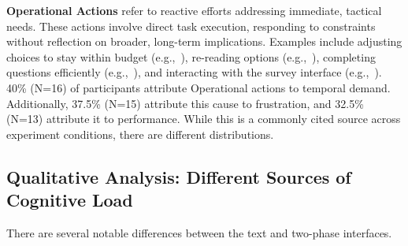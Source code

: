 \textbf{Operational Actions} refer to reactive efforts addressing immediate, tactical needs. These actions involve direct task execution, responding to constraints without reflection on broader, long-term implications. Examples include adjusting choices to stay within budget (e.g.,~), re-reading options (e.g.,~), completing questions efficiently (e.g.,~), and interacting with the survey interface (e.g.,~). 40\% (N=16) of participants attribute Operational actions to temporal demand. Additionally, 37.5\% (N=15) attribute this cause to frustration, and 32.5\% (N=13) attribute it to performance. While this is a commonly cited source across experiment conditions, there are different distributions. 




\subsection{Qualitative Analysis: Different Sources of Cognitive Load}
\label{sec:cog_diff}
There are several notable differences between the text and two-phase interfaces. 

